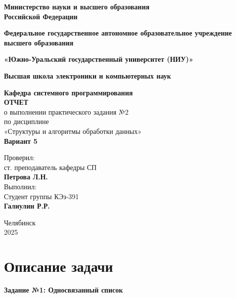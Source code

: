 \documentclass[a4paper,12pt]{article}
\begin{document}
	\begin{titlepage}
		\begin{center}
			{\large \textbf{Министерство науки и высшего образования \\ Российской Федерации}}
			
			{\large\textbf{Федеральное государственное автономное образовательное учреждение высшего образования}}
			
			{\large \textbf{«Южно-Уральский государственный университет (НИУ)»}}
			
			{\large \textbf{Высшая школа электроники и компьютерных наук}}
			
			{\large \textbf{Кафедра системного программирования}\\[2cm]
			}
			\textbf{ОТЧЕТ}\\[0.2cm]
			о выполнении практического задания №2\\[0.2cm]
			по дисциплине\\[0.2cm]
			«Структуры и алгоритмы обработки данных»\\[0.2cm]
			\textbf{Вариант 5}\\[3cm]
		\end{center}
		
		\begin{flushright}
			Проверил:\\[0.2cm]
			ст. преподаватель кафедры СП\\[0.2cm]
			\textbf{Петрова Л.Н.}\\[1cm]
						
			Выполнил:\\[0.2cm]
			Студент группы КЭз-391\\[0.2cm]
			\textbf{Галиулин Р.Р.}\\[0.2cm]
			
		\end{flushright}
		\vfill{}
		
		\begin{center}
			Челябинск \\ 2025
		\end{center}
	\end{titlepage}
	\newpage
	
	\tableofcontents
	
	\setcounter{page}{2}
	\newpage
	\section{Описание задачи}
	\textbf{Задание №1: Односвязанный список}
	
\end{document}
